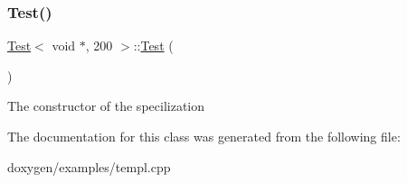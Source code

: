 \subsubsection{\texorpdfstring{Test()}{Test()}}
{\footnotesize\ttfamily \mbox{\hyperlink{class_test}{Test}}$<$ void $\ast$, 200 $>$\+::\mbox{\hyperlink{class_test}{Test}} (\begin{DoxyParamCaption}{ }\end{DoxyParamCaption})}

The constructor of the specilization 

The documentation for this class was generated from the following file\+:\begin{DoxyCompactItemize}
\item 
doxygen/examples/templ.\+cpp\end{DoxyCompactItemize}
